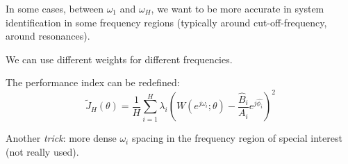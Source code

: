 
\begin{remark}
    In some cases, between $\omega_1$ and $\omega_H$, we want to be more accurate in system identification in some frequency regions (typically around cut-off-frequency, around resonances).

    We can use different weights for different frequencies.

    \begin{figure}[H]
        \centering
    \end{figure}

    The performance index can be redefined:
    \[
        \tilde{J}_H (\theta) = \frac{1}{H} \sum_{i=1}^H \lambda_i \left(W(e^{j\omega_i};\theta) - \frac{\hat{B}_i}{A_i}e^{j\hat{\phi_i}}\right)^2
    \]

    Another \emph{trick}: more dense $\omega_i$ spacing in the frequency region of special interest (not really used).
\end{remark}


